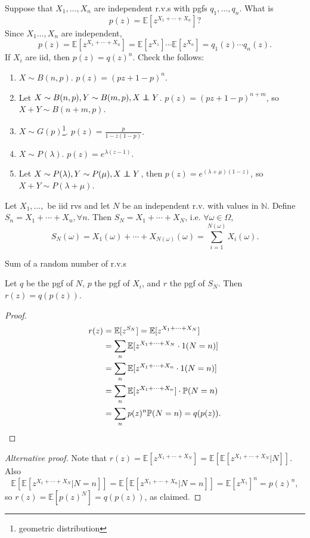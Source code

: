 \begin{example}
    Suppose that $ X_1,\dots,X_n $ are independent r.v.s with pgfs $ q_1,\dots,q_n $. What is 
    \[
        p(z) = \mathbb{E}[z^{X_1+\cdots+X_n}]?
    \]
    Since $ X_1\dots,X_n $ are independent, 
    \[
        p(z)= \mathbb{E}[z^{X_1+\cdots+X_n}] = \mathbb{E}[z^{X_1}]\cdots \mathbb{E}[z^{X_n}]=q_1(z)\cdots q_n(z).
    \]
    If $X_i$ are iid, then $p(z)=q(z)^n$. Check the follows:
    \begin{enumerate}
        \item $ X \sim B(n,p) $. $ p(z) = (pz+1-p)^n $.
        \item Let $ X \sim B(n,p), Y \sim B(m,p), X \independent Y $. $ p(z) = (pz+1-p)^{n+m} $, so $ X+Y \sim B(n+m,p) $.
        \item $ X \sim G(p) $\footnote{geometric distribution}. $\displaystyle p(z) = \frac{p}{1-z(1-p)} $.
        \item $ X \sim P(\lambda) $. $p(z) = e^{\lambda(z-1)} $.
        \item Let $ X \sim P(\lambda), Y \sim P(\mu),X \independent Y $, then $ p(z)=e^{(\lambda+\mu)(1-z)} $, so $ X+Y \sim P(\lambda+\mu) $.
    \end{enumerate}
\end{example}

\begin{definition}
    Let $ X_1,\dots, $ be iid rvs and let $N$ be an independent r.v. with values in $\mathbb{N}$. Define $S_n = X_1+\cdots+X_n,\forall n$. Then $ S_N=X_1+\cdots+X_N $, i.e. $ \forall \omega\in \Omega $, 
    \[
        S_N(\omega) = X_1(\omega)+\cdots+X_{N(\omega)}(\omega) = \sum_{i=1}^{N(\omega)}X_i(\omega).
    \]
\end{definition}
Sum of a random number of r.v.s
\begin{proposition}
    Let $q$ be the pgf of $N$, $p$ the pgf of $X_i$, and $r$ the pgf of $S_N$. Then $ r(z)=q(p(z)) $.
\end{proposition} 
\begin{proof}
    \begin{align*}
        r(z)&= \mathbb{E}[z^{S_N}] = \mathbb{E}[z^{X_1+\cdots+X_N}]\\ 
        &= \sum_{n} \mathbb{E}[z^{X_1+\cdots+X_N} \cdot 1(N=n)]\\ 
        &= \sum_{n} \mathbb{E}[z^{X_1+\cdots+X_n} \cdot 1(N=n)]\\ 
        &= \sum_n \mathbb{E}[z^{X_1+\cdots+X_n}] \cdot \mathbb{P}(N=n)\\ 
        &= \sum_n p(z)^n \mathbb{P}(N=n) = q(p(z)).\qedhere
    \end{align*}
\end{proof}
\begin{proof}[Alternative proof]
    Note that $ r(z)= \mathbb{E}[z^{X_1+\cdots+X_N}] = \mathbb{E}[\mathbb{E}[z^{X_1+\cdots+X_N}|N]] $. Also 
    \[
        \mathbb{E}[\mathbb{E}[z^{X_1+\cdots+X_N}|N=n]]=\mathbb{E}[\mathbb{E}[z^{X_1+\cdots+X_n}|N=n]]=\mathbb{E}[z^{X_1}]^n = p(z)^n,
    \]
    so $ r(z)=\mathbb{E}[p(z)^N] = q(p(z)) $, as claimed.
\end{proof}

